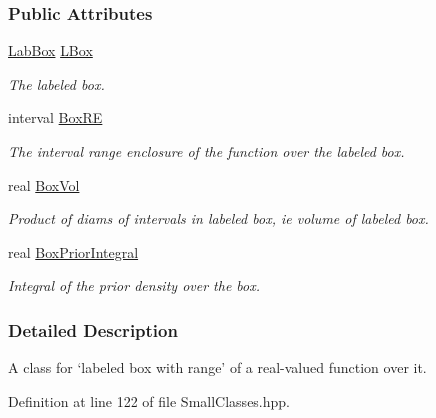 \subsubsection*{\-Public \-Attributes}
\begin{DoxyCompactItemize}
\item 
\hyperlink{classLabBox}{\-Lab\-Box} \hyperlink{classRangedLabBox_a2e70b4cbd89cb43736b04612d35efd89}{\-L\-Box}
\begin{DoxyCompactList}\small\item\em \-The labeled box. \end{DoxyCompactList}\item 
interval \hyperlink{classRangedLabBox_ae8b300e377bb19858a20929900e56411}{\-Box\-R\-E}
\begin{DoxyCompactList}\small\item\em \-The interval range enclosure of the function over the labeled box. \end{DoxyCompactList}\item 
real \hyperlink{classRangedLabBox_a39c03a61c15dd970e865d0619e81fa03}{\-Box\-Vol}
\begin{DoxyCompactList}\small\item\em \-Product of diams of intervals in labeled box, ie volume of labeled box. \end{DoxyCompactList}\item 
real \hyperlink{classRangedLabBox_a748168b1418e7a0a4f42a3373be377f2}{\-Box\-Prior\-Integral}
\begin{DoxyCompactList}\small\item\em \-Integral of the prior density over the box. \end{DoxyCompactList}\end{DoxyCompactItemize}


\subsubsection{\-Detailed \-Description}
\-A class for `labeled box with range' of a real-\/valued function over it. 

\-Definition at line 122 of file \-Small\-Classes.\-hpp.



